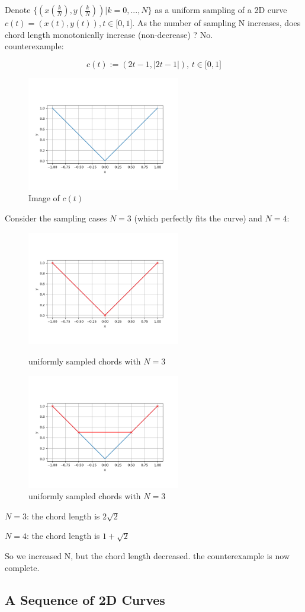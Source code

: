 \documentclass{scrartcl}
\begin{document}
Denote $\{(x(\frac{k}{N}), y(\frac{k}{N}))|k=0,...,N\}$ as a uniform sampling of a 2D curve
$c(t) = (x(t), y(t)), t \in \big[0,1\big]$. As the number of sampling N increases, does chord length monotonically
increase (non-decrease) ? No. \\
counterexample:

\begin{equation}
c(t):=(2t-1, |2t-1|),\, t	\in \big[0,1\big]
\end{equation}

\begin{figure}[h]
	\centering
	\includegraphics[height=5cm]{figures/plot_abs_function.png}
	\caption{Image of $c(t)$}
	\label{fig:abs}
\end{figure}

Consider the sampling cases $N=3$ (which perfectly fits the curve) and $N=4$:

\begin{figure}[h]
\centering
\begin{minipage}{.5\textwidth}
	\centering
	\includegraphics[height=5cm]{figures/plot_abs_function_n3.png}
	\caption{uniformly sampled chords with $N=3$}
	\label{fig:abs_n3}
\end{minipage}%
\begin{minipage}{.5\textwidth}
	\centering
	\includegraphics[height=5cm]{figures/plot_abs_function_n4.png}
	\caption{uniformly sampled chords with $N=3$}
	\label{fig:abs_n4}
\end{minipage}
\end{figure}

$N=3$: the chord length is $2\sqrt{2}$

$N=4$: the chord length is $1 + \sqrt{2}$

So we increased N, but the chord length decreased. the counterexample is now complete.


\subsection{A Sequence of 2D Curves}
	
\end{document}
